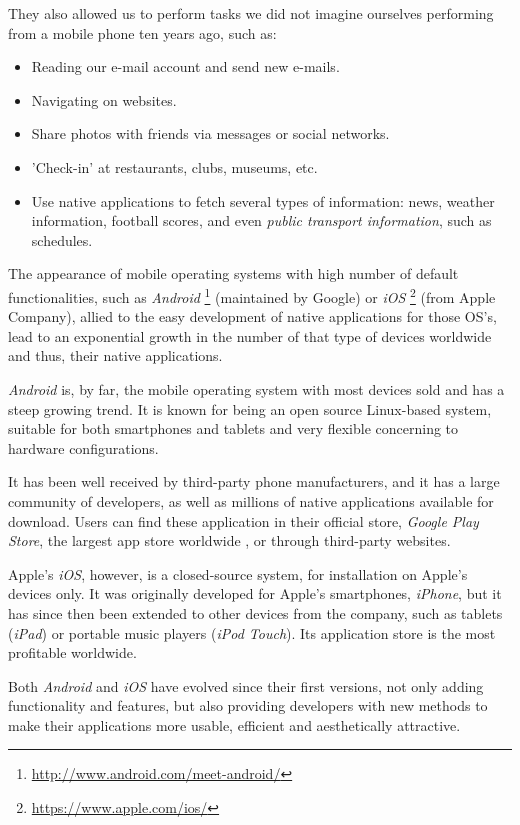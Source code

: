 They also allowed us to perform tasks we did not imagine ourselves performing from a mobile phone ten years ago, such as:

\begin{itemize}
\item Reading our e-mail account and send new e-mails.
\item Navigating on websites.
\item Share photos with friends via messages or social networks.
\item 'Check-in' at restaurants, clubs, museums, etc.
\item Use native applications to fetch several types of information: news, weather information, football scores, and even \emph{public transport information}, such as schedules.
\end{itemize}

The appearance of mobile operating systems with high number of default functionalities, such as \emph{Android} \footnote{\url{http://www.android.com/meet-android/}} (maintained by Google) or \emph{iOS} \footnote{\url{https://www.apple.com/ios/}} (from Apple Company), allied to the easy development of native applications for those OS's, lead to an exponential growth in the number of that type of devices worldwide and thus, their native applications.

\emph{Android} is, by far, the mobile operating system with most devices sold \cite{kn:McC13}\cite{kn:McG13} and has a steep growing trend. It is known for being an open source Linux-based system, suitable for both smartphones and tablets and very flexible concerning to hardware configurations.

It has been well received by third-party phone manufacturers, and it has a large community of developers, as well as millions of native applications available for download. Users can find these application in their official store, \emph{Google Play Store}, the largest app store worldwide \cite{kn:Are13}, or through third-party websites.

Apple's \emph{iOS}, however, is a closed-source system, for installation on Apple's devices only. 
It was originally developed for Apple's smartphones, \emph{iPhone}, but it has since then been extended to other devices from the company, such as tablets (\emph{iPad}) or portable music players (\emph{iPod Touch}). Its application store is the most profitable worldwide.

Both \emph{Android} and \emph{iOS} have evolved since their first versions, not only adding functionality and features, but also providing developers with new methods to make their applications more usable, efficient and aesthetically attractive.

